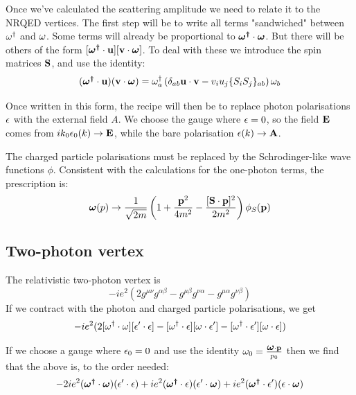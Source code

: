 Once we've calculated the scattering amplitude we need to relate it to the NRQED vertices.  The first step will be to write all terms "sandwiched" between $\omega^\dagger$ and $\omega$.  Some terms will already be proportional to $\mbox{\boldmath$ \omega^\dagger $} \cdot \mbox{\boldmath$ \omega $}$.  But there will be others of the form $[\mbox{\boldmath$ \omega^\dagger $} \cdot \mathbf{u}] [\mathbf{v} \cdot \mbox{\boldmath$ \omega $}]$.  To deal with these we introduce the spin matrices $\mathbf{S}$, and use the identity:
\[
	(\mbox{\boldmath$ \omega^\dagger $} \cdot \mathbf{u}) (\mathbf{v} \cdot \mbox{\boldmath$ \omega $}) = \omega^\dagger_a \left( \delta_{ab} \mathbf{u} \cdot \mathbf{v} - v_i u_j\{S_i S_j\}_{ab}  \right) \omega_b
\]


Once written in this form, the recipe will then be to replace photon polarisations $\epsilon$ with the external field $A$.  We choose the gauge where $\epsilon=0$, so the field $\mathbf{E}$ comes from	$ik_0 \epsilon_0(k) \to \mathbf{E}$, while the bare polarisation $\mathbf{\epsilon}(k) \to \mathbf{A}$.

The charged particle polarisations must be replaced by the Schrodinger-like wave functions $\phi$.  Consistent with the calculations for the one-photon terms, the prescription is:
\[
	\mbox{\boldmath$ \omega $}(p) \to \frac{1}{\sqrt{2m}}\left( 1 + \frac{\mathbf{p}^2}{4m^2} - \frac{ [\mathbf{S}\cdot \mathbf{p}]^2 } {2m^2} \right)\phi_S(\mathbf{p})
\]




\subsection{Two-photon vertex}

The relativistic two-photon vertex is
\[
 -i e^2 ( 2 g^{\mu\nu} g^{\alpha \beta} - g^{\mu \beta} g^{\nu \alpha} - g^{\mu \alpha} g^{\nu \beta} )
\]
If we contract with the photon and charged particle polarisations, we get
\[
	 -i e^2( 2[\omega^\dagger \cdot \omega][\epsilon' \cdot \epsilon] - [\omega^\dagger \cdot \epsilon] [ \omega \cdot \epsilon']  -[\omega^\dagger \cdot \epsilon'] [ \omega \cdot \epsilon] )
\]




If we choose a gauge where $\epsilon_0 = 0$ and use the identity $\omega_0 = \frac{\mbox{\boldmath$ \omega $} \cdot \mathbf{p}}{p_0}$ then we find that the above is, to the order needed:
\[
 -2 i e^2 (\mbox{\boldmath$ \omega^\dagger $} \cdot \mbox{\boldmath$ \omega $}) (\mathbf{\epsilon}' \cdot \mathbf{\epsilon}) 
	+  i e^2 (\mbox{\boldmath$ \omega^\dagger $} \cdot  \mathbf{\epsilon}) (\mathbf{\epsilon'} \cdot \mbox{\boldmath$ \omega $})	
	+  i e^2 (\mbox{\boldmath$ \omega^\dagger $} \cdot  \mathbf{\epsilon'}) (\mathbf{\epsilon} \cdot \mbox{\boldmath$ \omega $})	
\]



